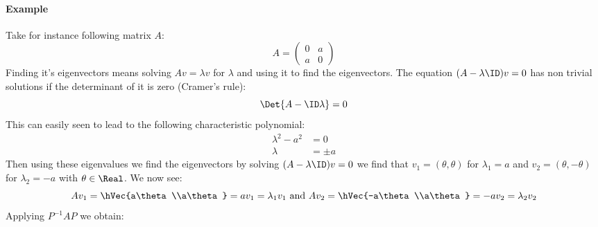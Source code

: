 \paragraph{Example}
Take for instance following matrix $A$:
\begin{equation}
A = \begin{pmatrix}
0 & a \\
a & 0
\end{pmatrix}
\end{equation}
Finding it's eigenvectors means solving $Av = \lambda v$ for $\lambda$ and using it to find the eigenvectors. The equation $(A-\lambda\ID)v = 0$ has non trivial solutions if the determinant of it is zero (Cramer's rule):
\begin{equation}
\Det{A-\ID\lambda} = 0 
\end{equation}
This can easily seen to lead to the following characteristic polynomial:
\begin{equation}
\begin{split}
\lambda^2 - a^2 &= 0\\
\lambda &= \pm a
\end{split}
\end{equation}
Then using these eigenvalues we find the eigenvectors by solving $(A-\lambda\ID)v = 0$ we find that $v_1 = (\theta, \theta)$ for $\lambda_1 = a$ and $v_2=(\theta,-\theta)$ for $\lambda_2=-a$ with $\theta \in \Real$. We now see:
\begin{equation}
Av_1 = \hVec{a\theta\\a\theta} =av_1 = \lambda_1v_1 \text{ and } Av_2 = \hVec{-a\theta\\a\theta}=-av_2= \lambda_2v_2
\end{equation}
Applying $P^{-1}AP$ we obtain:
